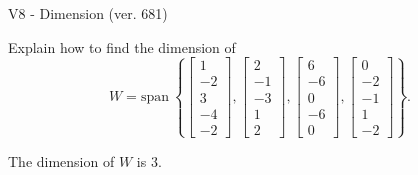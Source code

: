 \begin{exercise}
  \begin{exerciseTitle}V8 - Dimension (ver. 681)\end{exerciseTitle}
  \begin{exerciseStatement}
    Explain how to find the dimension of 
\[W=\mathrm{span}\ \left\{\left[\begin{array}{r}
1 \\
-2 \\
3 \\
-4 \\
-2
\end{array}\right] , \left[\begin{array}{r}
2 \\
-1 \\
-3 \\
1 \\
2
\end{array}\right] , \left[\begin{array}{r}
6 \\
-6 \\
0 \\
-6 \\
0
\end{array}\right] , \left[\begin{array}{r}
0 \\
-2 \\
-1 \\
1 \\
-2
\end{array}\right]\right\}.\]



  \end{exerciseStatement}
  \begin{exerciseAnswer}
   The dimension of \(W\) is  \(3\).
  


  \end{exerciseAnswer}
\end{exercise}